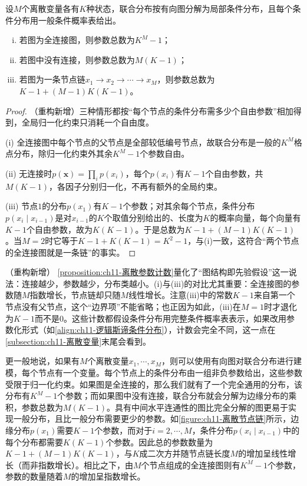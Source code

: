 \documentclass[../../main.tex]{subfiles}
\begin{document}
\begin{proposition}[离散图模型的参数计数]\label{proposition:ch11-离散参数计数}
设$M$个离散变量各有$K$种状态，联合分布按有向图分解为局部条件分布，且每个条件分布用一般条件概率表给出。
\begin{enumerate}[(i)]
  \item 若图为全连接图，则参数总数为$K^M-1$；
  \item 若图中没有连接，则参数总数为$M(K-1)$；
  \item 若图为一条节点链$x_1\to x_2\to\cdots\to x_M$，则参数总数为$K-1+(M-1)K(K-1)$。
\end{enumerate}
\end{proposition}

\begin{proof}
（重构新增）三种情形都按“每个节点的条件分布需多少个自由参数”相加得到，全局归一化约束只消耗一个自由度。

(i) 全连接图中每个节点的父节点是全部较低编号节点，故联合分布是一般的$K^M$格点分布，除归一化约束外其余$K^M-1$个参数自由。

(ii) 无连接时$p(\mathbf{x})=\prod_i p(x_i)$，每个$p(x_i)$有$K-1$个自由参数，共$M(K-1)$，各因子分别归一化，不再有额外的全局约束。

(iii) 节点$1$的分布$p(x_1)$有$K-1$个参数；对其余每个节点，条件分布$p(x_i\mid x_{i-1})$是对$x_{i-1}$的$K$个取值分别给出的、长度为$K$的概率向量，每个向量有$K-1$个自由参数，故为$K(K-1)$。于是总数为$K-1+(M-1)K(K-1)$。当$M=2$时它等于$K-1+K(K-1)=K^2-1$，与(i)一致，这符合“两个节点的全连接图就是一条链”的事实。
\end{proof}

\begin{remark}（重构新增）
\cref{proposition:ch11-离散参数计数}量化了“图结构即先验假设”这一说法：连接越少，参数越少，分布类越小。(i)与(iii)的对比尤其重要：全连接图的参数随$M$指数增长，节点链却只随$M$线性增长。注意(iii)中的常数$K-1$来自第一个节点没有父节点，这个“边界项”不能省略；也正因为如此，(iii)在$M=1$时才退化为$K-1$而不是$0$。这些计数都假设条件分布用完整条件概率表表示，如果改用参数化形式（如\eqref{align:ch11-逻辑斯谛条件分布}），计数会完全不同，这一点在\cref{subsection:ch11-离散变量}末尾会看到。
\end{remark}

更一般地说，如果有$M$个离散变量$x_1,\cdots,x_M$，则可以使用有向图对联合分布进行建模，每个节点有一个变量。每个节点上的条件分布由一组非负参数给出，这些参数受限于归一化约束。如果图是全连接的，那么我们就有了一个完全通用的分布，该分布有$K^M-1$个参数；而如果图中没有连接，联合分布就会分解为边缘分布的乘积，参数总数为$M(K-1)$。具有中间水平连通性的图比完全分解的图更易于实现一般分布，且比一般分布需要更少的参数。如\cref{figure:ch11-离散节点链}所示，边缘分布$p(x_1)$需要$K-1$个参数，而对于$i=2,\cdots,M$，条件分布$p(x_i\mid x_{i-1})$中的每个分布都需要$K(K-1)$个参数。因此总的参数数量为$K-1+(M-1)K(K-1)$，与$K$成二次方并随节点链长度$M$的增加呈线性增长（而非指数增长）。相比之下，由$M$个节点组成的全连接图则有$K^M-1$个参数，参数的数量随着$M$的增加呈指数增长。
\end{document}
